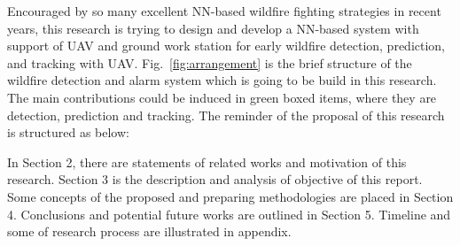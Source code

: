 Encouraged by so many excellent NN-based wildfire fighting strategies in recent years, this research is trying to design and develop a NN-based system with support of UAV and ground work station for early wildfire detection, prediction, and tracking with UAV. Fig.~\ref{fig:arrangement} is the brief structure of the wildfire detection and alarm system which is going to be build in this research. The main contributions could be induced in green boxed items, where they are detection, prediction and tracking. The reminder of the proposal of this research is structured as below:\par 
In Section 2, there are statements of related works and motivation of this research. Section 3 is the description and analysis of objective of this report. Some concepts of the proposed and preparing methodologies are placed in Section 4. Conclusions and potential future works are outlined in Section 5. Timeline and some of research process are illustrated in appendix.\par

\vspace{-0.3cm}
